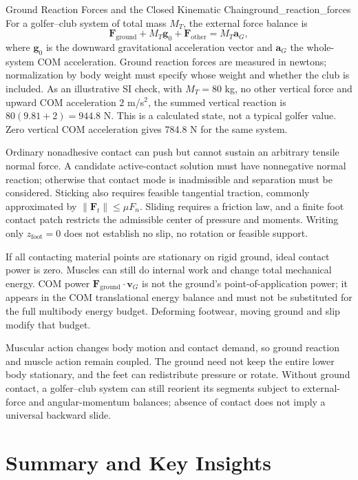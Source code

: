 \begin{example}{Ground Reaction Forces and the Closed Kinematic Chain}{ground_reaction_forces}
For a golfer--club system of total mass $M_T$, the external force balance is
\[
\bm F_{\mathrm{ground}}+M_T\bm g_0+\bm F_{\mathrm{other}}
=M_T\bm a_G,
\]
where $\bm g_0$ is the downward gravitational acceleration vector and $\bm a_G$ the whole-system COM acceleration. Ground reaction forces are measured in newtons; normalization by body weight must specify whose weight and whether the club is included. As an illustrative SI check, with $M_T=80$ kg, no other vertical force and upward COM acceleration $2$ m/s$^2$, the summed vertical reaction is $80(9.81+2)=944.8$ N. This is a calculated state, not a typical golfer value. Zero vertical COM acceleration gives 784.8 N for the same system.

Ordinary nonadhesive contact can push but cannot sustain an arbitrary tensile normal force. A candidate active-contact solution must have nonnegative normal reaction; otherwise that contact mode is inadmissible and separation must be considered. Sticking also requires feasible tangential traction, commonly approximated by $\|\bm F_t\|\le\mu F_n$. Sliding requires a friction law, and a finite foot contact patch restricts the admissible center of pressure and moments. Writing only $z_{\mathrm{foot}}=0$ does not establish no slip, no rotation or feasible support.

If all contacting material points are stationary on rigid ground, ideal contact power is zero. Muscles can still do internal work and change total mechanical energy. COM power $\bm F_{\mathrm{ground}}\cdot\bm v_G$ is not the ground's point-of-application power; it appears in the COM translational energy balance and must not be substituted for the full multibody energy budget. Deforming footwear, moving ground and slip modify that budget.

Muscular action changes body motion and contact demand, so ground reaction and muscle action remain coupled. The ground need not keep the entire lower body stationary, and the feet can redistribute pressure or rotate. Without ground contact, a golfer--club system can still reorient its segments subject to external-force and angular-momentum balances; absence of contact does not imply a universal backward slide.
\end{example}

\section{Summary and Key Insights}
\label{sec:constraint_forces_summary}

